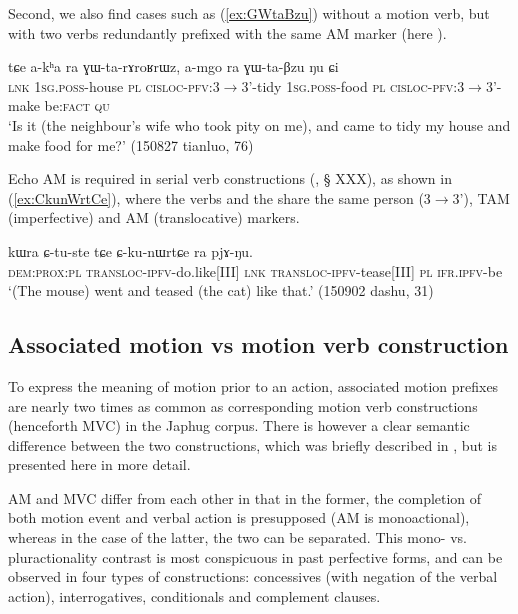 Second, we also find cases such as (\ref{ex:GWtaBzu}) without a motion verb, but with two verbs redundantly prefixed with the same AM marker (here ).

\begin{exe}
\ex \label{ex:GWtaBzu}
\gll  tɕe a-kʰa ra ɣɯ-ta-rɤroʁrɯz, 	a-mgo  ra ɣɯ-ta-βzu ŋu ɕi \\
\textsc{lnk} \textsc{1sg}.\textsc{poss}-house \textsc{pl} \textsc{cisloc}-\textsc{pfv}:3$\rightarrow$3'-tidy 
 \textsc{1sg}.\textsc{poss}-food \textsc{pl} \textsc{cisloc}-\textsc{pfv}:3$\rightarrow$3'-make be:\textsc{fact} \textsc{qu} \\ 
\glt `Is it (the neighbour's wife who took pity on me), and came to tidy my house and make food for me?'  (150827 tianluo, 76)
\end{exe}


Echo AM is required in serial verb constructions (\citealt[253-255]{jacques16complementation}, § XXX), as shown in (\ref{ex:CkunWrtCe}), where the verbs  and the  share the same person (3$\rightarrow$3'), TAM (imperfective) and AM (translocative) markers.

\begin{exe}
\ex \label{ex:CkunWrtCe}
\gll  kɯra ɕ-tu-ste tɕe ɕ-ku-nɯrtɕe ra pjɤ-ŋu. \\
\textsc{dem}:\textsc{prox}:\textsc{pl} \textsc{transloc}-\textsc{ipfv}-do.like[III] \textsc{lnk}  \textsc{transloc}-\textsc{ipfv}-tease[III] \textsc{pl} \textsc{ifr}.\textsc{ipfv}-be \\
\glt `(The mouse) went and teased (the cat) like that.' (150902 dashu, 31)
\end{exe}

\subsection{Associated motion vs motion verb construction}
To express the meaning of motion prior to an action, associated motion prefixes are nearly two times as common as corresponding motion verb constructions (henceforth MVC) in the Japhug corpus. There is however a clear semantic difference between the two constructions, which was briefly described in \citet{jacques13harmonization}, but is presented here in more detail.

AM and MVC differ from each other in that in the former, the completion of both motion event and verbal action is presupposed (AM is monoactional), whereas in the case of the latter, the two can be separated. This mono- vs. pluractionality contrast is most conspicuous in past perfective forms, and can be observed in four types of constructions: concessives (with negation of the verbal action), interrogatives, conditionals and complement clauses. 

